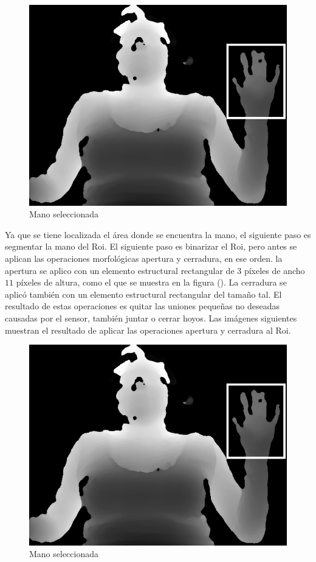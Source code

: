 \begin{figure}[!h]
\begin{center}
\includegraphics[scale=.5]{./Figures/roi.png}
\end{center}
\caption{Mano seleccionada}
\label{fig:Roi}
\end{figure}  

Ya que se tiene localizada el área donde se encuentra la mano, el siguiente paso es segmentar la mano del Roi. El siguiente paso es binarizar el Roi, pero antes se aplican las operaciones morfológicas apertura y cerradura, en ese orden. la apertura se aplico con un elemento estructural rectangular de $3$ p\'ixeles de ancho $11$ p\'ixeles de altura, como el que se muestra en la figura (). La cerradura se aplic\'o también con un elemento estructural rectangular del tamaño tal. 
El resultado de estas operaciones es quitar las uniones pequeñas no deseadas causadas por el sensor, también juntar o cerrar hoyos.  
Las imágenes siguientes muestran el resultado de aplicar las operaciones apertura y cerradura al Roi. 

\begin{figure}[!h]
\begin{center}
\includegraphics[scale=.5]{./Figures/roi.png}
\end{center}
\caption{Mano seleccionada}
\label{fig:Roi}
\end{figure}  


